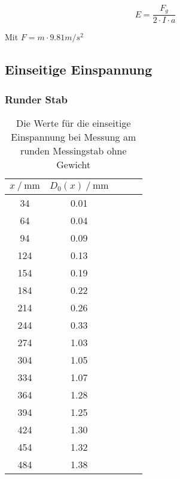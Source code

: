 \begin{equation}
   E = \frac{F_g}{2 \cdot I \cdot a}   
\end{equation}

Mit $F = m \cdot 9.81 m/s^2$



\subsection{Einseitige Einspannung}
\label{sec:Einseitige Einspannung}

      \subsubsection{Runder Stab}
      \label{sec:Runder Stab}


\begin{table}[H]
  \centering
  \caption{Die Werte für die einseitige Einspannung bei Messung am runden Messingstab ohne Gewicht}
  \begin{tabular}{ccccc}
    \toprule
    {$x \mathbin{/} \unit{\milli\metre}$} &
    {$D_0(x) \mathbin{/} \unit{\milli\metre}$} \\
    \midrule
    34 & 0.01 \\  
    64 & 0.04 \\
    94 & 0.09 \\
    124 & 0.13 \\  
    154 & 0.19 \\
    184 & 0.22 \\
    214 & 0.26 \\
    244 & 0.33 \\
    274 & 1.03 \\
    304 & 1.05 \\
    334 & 1.07 \\
    364 & 1.28 \\
    394 & 1.25 \\
    424 & 1.30 \\
    454 & 1.32 \\
    484 & 1.38 \\

    \bottomrule
  \end{tabular}
  \label{tab:Tabelle3}
\end{table}




